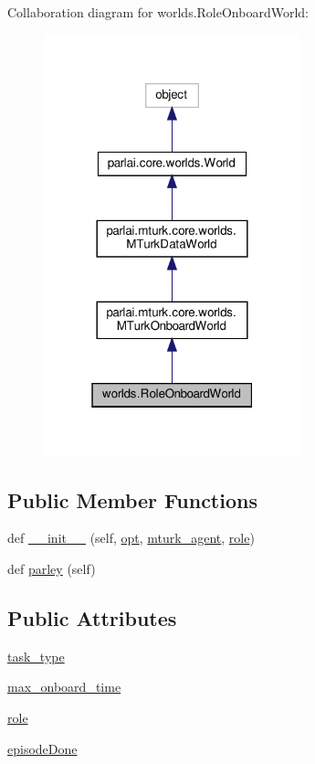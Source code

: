 Collaboration diagram for worlds.\+Role\+Onboard\+World\+:
\nopagebreak
\begin{figure}[H]
\begin{center}
\leavevmode
\includegraphics[width=211pt]{classworlds_1_1RoleOnboardWorld__coll__graph}
\end{center}
\end{figure}
\subsection*{Public Member Functions}
\begin{DoxyCompactItemize}
\item 
def \hyperlink{classworlds_1_1RoleOnboardWorld_abbc8f1021ee70a0f80a0d1ccb5da7ee6}{\+\_\+\+\_\+init\+\_\+\+\_\+} (self, \hyperlink{classparlai_1_1core_1_1worlds_1_1World_a3640d92718acd3e6942a28c1ab3678bd}{opt}, \hyperlink{classparlai_1_1mturk_1_1core_1_1worlds_1_1MTurkOnboardWorld_a38d19c84f42e452f782df53df4fb9861}{mturk\+\_\+agent}, \hyperlink{classworlds_1_1RoleOnboardWorld_a7cfcb62d23a40aa3ff04564d4a3d7f2d}{role})
\item 
def \hyperlink{classworlds_1_1RoleOnboardWorld_a3adcbdb41aa941d672d4d0f3ebbd27e4}{parley} (self)
\end{DoxyCompactItemize}
\subsection*{Public Attributes}
\begin{DoxyCompactItemize}
\item 
\hyperlink{classworlds_1_1RoleOnboardWorld_add7b379681fc5822e996d3e26b3d86dc}{task\+\_\+type}
\item 
\hyperlink{classworlds_1_1RoleOnboardWorld_ac05342258f7aadaa63549459cef4be61}{max\+\_\+onboard\+\_\+time}
\item 
\hyperlink{classworlds_1_1RoleOnboardWorld_a7cfcb62d23a40aa3ff04564d4a3d7f2d}{role}
\item 
\hyperlink{classworlds_1_1RoleOnboardWorld_a72c09a6b49ffa39e2fd2a9288a0eb5ab}{episode\+Done}
\end{DoxyCompactItemize}


